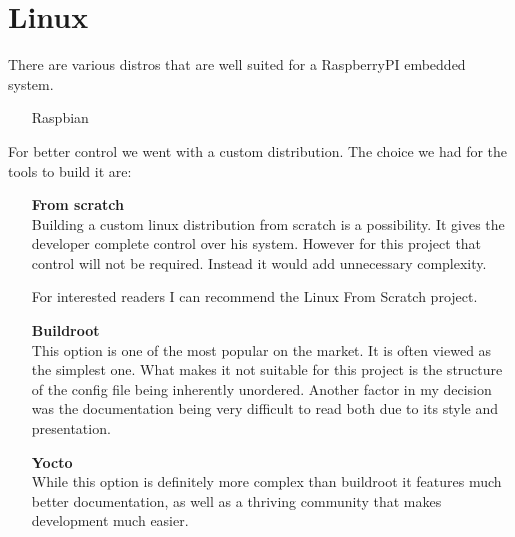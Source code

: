 \clearpage
\section{Linux}

There are various distros that are well suited for a RaspberryPI embedded
system.

\begin{itemize}
    \item[Raspbian]
\end{itemize}

For better control we went with a custom distribution. The choice we had for
the tools to build it are:
\begin{itemize}
    \item[]
          {\large\textbf{From scratch}}\\
          Building a custom linux distribution from scratch is a possibility. It gives the developer complete control over his system.
          However for this project that control will not be required. Instead it would add unnecessary complexity.

          For interested readers I can recommend the Linux From Scratch project.
    \item[]
          {\large\textbf{Buildroot}}\\
          This option is one of the most popular on the market. It is often viewed as the simplest one.
          What makes it not suitable for this project is the structure of the config file being inherently unordered.
          Another factor in my decision was the documentation being very difficult to read both due to its style and presentation.
    \item[]
          {\large\textbf{Yocto}}\\
          While this option is definitely more complex than buildroot it features much better documentation, as well as a thriving community
          that makes development much easier.
\end{itemize}
